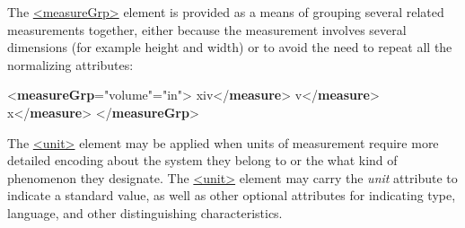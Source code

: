 The \hyperref[TEI.measureGrp]{<measureGrp>} element is provided as a means of grouping several related measurements together, either because the measurement involves several dimensions (for example height and width) or to avoid the need to repeat all the normalizing attributes: \par\bgroup{}\exampleFont \begin{shaded}\noindent\mbox{}{<\textbf{measureGrp}\hspace*{1em}{type}="{volume}"\hspace*{1em}{unit}="{in}">}\mbox{}\newline 
{}xiv{</\textbf{measure}>}\mbox{}\newline 
{}v{</\textbf{measure}>}\mbox{}\newline 
{}x{</\textbf{measure}>}\mbox{}\newline 
{</\textbf{measureGrp}>}\end{shaded}\egroup\par \noindent  \par
The \hyperref[TEI.unit]{<unit>} element may be applied when units of measurement require more detailed encoding about the system they belong to or the what kind of phenomenon they designate. The \hyperref[TEI.unit]{<unit>} element may carry the {\itshape unit} attribute to indicate a standard value, as well as other optional attributes for indicating type, language, and other distinguishing characteristics. 
